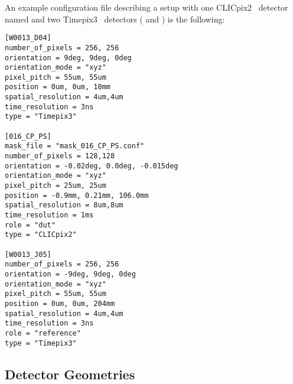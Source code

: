 An example configuration file describing a setup with one CLICpix2~\cite{clicpix2,clicpix2-pisa} detector named  and two Timepix3~\cite{timepix3} detectors ( and ) is the following:

\begin{verbatim}
[W0013_D04]
number_of_pixels = 256, 256
orientation = 9deg, 9deg, 0deg
orientation_mode = "xyz"
pixel_pitch = 55um, 55um
position = 0um, 0um, 10mm
spatial_resolution = 4um,4um
time_resolution = 3ns
type = "Timepix3"

[016_CP_PS]
mask_file = "mask_016_CP_PS.conf"
number_of_pixels = 128,128
orientation = -0.02deg, 0.0deg, -0.015deg
orientation_mode = "xyz"
pixel_pitch = 25um, 25um
position = -0.9mm, 0.21mm, 106.0mm
spatial_resolution = 8um,8um
time_resolution = 1ms
role = "dut"
type = "CLICpix2"

[W0013_J05]
number_of_pixels = 256, 256
orientation = -9deg, 9deg, 0deg
orientation_mode = "xyz"
pixel_pitch = 55um, 55um
position = 0um, 0um, 204mm
spatial_resolution = 4um,4um
time_resolution = 3ns
role = "reference"
type = "Timepix3"
\end{verbatim}

\subsection{Detector Geometries}
\label{sec:detector_geometries}

